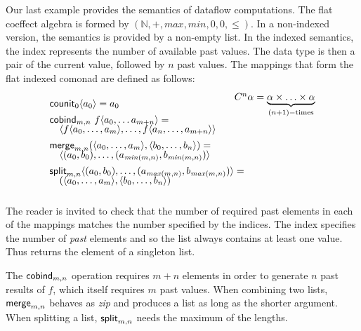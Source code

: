 \begin{example}
\label{thm:semantics-indexed-list}

Our last example provides the semantics of dataflow computations. The flat coeffect algebra
is formed by $(\mathbb{N}, +, \mathit{max}, \mathit{min}, 0, 0, \leq)$. In a
non-indexed version, the semantics is provided by a non-empty list. In the indexed semantics,
the index represents the number of available past values. The data type is then a pair of
the current value, followed by $n$ past values. The mappings that form the flat indexed comonad
are defined as follows:
%
\begin{equation*}
\begin{array}{l}
\ident{counit}_{0}\langle a_0 \rangle = a_0
\\[0.45em]
\ident{cobind}_{m, n}~f \langle a_0, \ldots a_{m+n} \rangle = \\[-0.25em]
\quad \langle f \langle a_0, \ldots, a_m \rangle, \ldots, f \langle a_{n}, \ldots, a_{m+n} \rangle \rangle
\\[0.45em]
\ident{merge}_{m, n} (\langle a_0, \ldots, a_m \rangle, \langle b_0, \ldots, b_n\rangle) = \\[-0.25em]
\quad \langle (a_0, b_0), \ldots, (a_{\mathit{min}(m,n)}, b_{\mathit{min}(m,n)}) \rangle
\\[0.45em]
\ident{split}_{m, n} \langle (a_0, b_0), \ldots, (a_{\mathit{max}(m,n)}, b_{\mathit{max}(m,n)}) \rangle = \\[-0.25em]
\quad (\langle a_0, \ldots, a_m \rangle, \langle b_0, \ldots, b_n\rangle)
\end{array}
\begin{array}{l}
\hspace{-2em}\ctyp{n}{\alpha} = \underbrace{\alpha \times \ldots \times \alpha}_{(n+1)-\textnormal{times}}\\[8em]
~\\
\end{array}
\end{equation*}
\end{example}

\noindent
The reader is invited to check that the number of required past elements in each of the mappings
matches the number specified by the indices. The index specifies the number of \emph{past} elements
and so the list always contains at least one value. Thus  returns the element of a
singleton list.

The $\textnormal{\sffamily cobind}_{m,n}$ operation requires $m + n$ elements in order to generate $n$ past results
of $f$, which itself requires $m$ past values. When combining two lists, $\textnormal{\sffamily merge}_{m,n}$
behaves as \emph{zip} and produces a list as long as the shorter argument. When splitting a list,
$\textnormal{\sffamily split}_{m, n}$ needs the maximum of the lengths.


